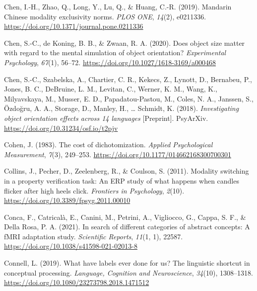 \documentclass[
  12pt,
  man,floatsintext]{apa7}
\newlength{\cslhangindent}
\newlength{\cslentryspacingunit} %
\newenvironment{CSLReferences}[2] %
 {%
  \setlength{\parindent}{0pt}
  \ifodd #1
  \let\oldpar\par
  \def\par{\hangindent=\cslhangindent\oldpar}
  \fi
  \setlength{\parskip}{#2\cslentryspacingunit}
 }%
 {}
\begin{document}
\begin{CSLReferences}{1}{0}
\leavevmode{}%
Chen, I.-H., Zhao, Q., Long, Y., Lu, Q., \& Huang, C.-R. (2019). Mandarin {Chinese} modality exclusivity norms. \emph{PLOS ONE}, \emph{14}(2), e0211336. \url{https://doi.org/10.1371/journal.pone.0211336}

\leavevmode{}%
Chen, S.-C., de Koning, B. B., \& Zwaan, R. A. (2020). Does object size matter with regard to the mental simulation of object orientation? \emph{Experimental Psychology}, \emph{67}(1), 56--72. \url{https://doi.org/10.1027/1618-3169/a000468}

\leavevmode{}%
Chen, S.-C., Szabelska, A., Chartier, C. R., Kekecs, Z., Lynott, D., Bernabeu, P., Jones, B. C., DeBruine, L. M., Levitan, C., Werner, K. M., Wang, K., Milyavskaya, M., Musser, E. D., Papadatou-Pastou, M., Coles, N. A., Janssen, S., Özdoğru, A. A., Storage, D., Manley, H., \ldots{} Schmidt, K. (2018). \emph{Investigating object orientation effects across 14 languages} {[}Preprint{]}. {PsyArXiv}. \url{https://doi.org/10.31234/osf.io/t2pjv}

\leavevmode{}%
Cohen, J. (1983). The cost of dichotomization. \emph{Applied Psychological Measurement}, \emph{7}(3), 249--253. \url{https://doi.org/10.1177/014662168300700301}

\leavevmode{}%
Collins, J., Pecher, D., Zeelenberg, R., \& Coulson, S. (2011). Modality switching in a property verification task: {An} {ERP} study of what happens when candles flicker after high heels click. \emph{Frontiers in Psychology}, \emph{2}(10). \url{https://doi.org/10.3389/fpsyg.2011.00010}

\leavevmode{}%
Conca, F., Catricalà, E., Canini, M., Petrini, A., Vigliocco, G., Cappa, S. F., \& Della Rosa, P. A. (2021). In search of different categories of abstract concepts: A {fMRI} adaptation study. \emph{Scientific Reports}, \emph{11}(1, 1), 22587. \url{https://doi.org/10.1038/s41598-021-02013-8}

\leavevmode{}%
Connell, L. (2019). What have labels ever done for us? {The} linguistic shortcut in conceptual processing. \emph{Language, Cognition and Neuroscience}, \emph{34}(10), 1308--1318. \url{https://doi.org/10.1080/23273798.2018.1471512}


\end{CSLReferences}
\end{document}
